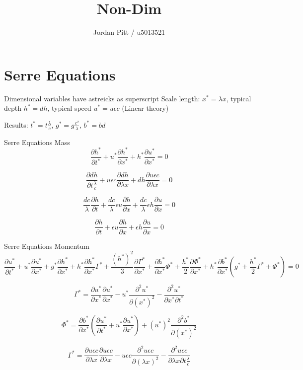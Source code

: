 \documentclass[12pt]{article}
\begin{document}
\title{Non-Dim}
\author{Jordan Pitt / u5013521}

\section{Serre Equations}
Dimensional variables have astreicks as superscript
Scale length: $x^* = \lambda x$, typical depth $h^* = dh$, typical speed $u^* = u\epsilon c$ (Linear theory)

Results: $t^* = t \frac{\lambda}{c}$, $g^* = g \frac{c^2}{\lambda}$, $b^* = bd$

Serre Equations Mass
\[\frac{\partial h^*}{\partial t^*} +u^*\frac{\partial h^*}{\partial x^*} + h^* \frac{\partial u^*}{\partial x^*}  = 0\]

\[\frac{\partial dh}{\partial t \frac{\lambda}{c}} +u\epsilon c\frac{\partial dh}{\partial \lambda x} + dh \frac{\partial u \epsilon c}{\partial \lambda x}  = 0\]

\[\frac{dc}{\lambda}\frac{\partial h}{\partial t} + \frac{dc}{\lambda} \epsilon u\frac{\partial h}{\partial x} + \frac{dc}{\lambda} \epsilon h \frac{\partial u}{\partial x}  = 0\]

\[\frac{\partial h}{\partial t} + \epsilon u\frac{\partial h}{\partial x} + \epsilon h \frac{\partial u}{\partial x}  = 0\]

Serre Equations Momentum
\[\frac{\partial u^*}{\partial t^*} + u^*\frac{\partial u^*}{\partial x^*} + g^*\frac{\partial h^*}{\partial x^*} + h^*\frac{\partial h^*}{\partial x^*}\Gamma^*+ \frac{\left(h^*\right)^2}{3}\frac{\partial \Gamma^*}{\partial x^*} + \frac{\partial h^*}{\partial x^*}\Phi^*+ \frac{h^*}{2}\frac{\partial \Phi^*}{\partial x^*} + h^* \frac{\partial b^*}{\partial x^*}\left(g^* + \frac{h^*}{2}\Gamma^* + \Phi^*\right) = 0   \]

\[\Gamma^* = \frac{\partial u^*}{\partial x^*}\frac{\partial u^*}{\partial x^*} - u^*\frac{\partial^2 u^*}{\partial (x^*)^2} - \frac{\partial^2 u^*}{\partial x^* \partial t^*}\]

\[\Phi^* = \frac{\partial b^*}{\partial x^*}\left( \frac{\partial u^*}{\partial t^*} + u^*\frac{\partial u^*}{\partial x^*}\right) + (u^*)^2\frac{\partial^2 b^*}{\partial (x^*)^2} \]

\[\Gamma^* = \frac{\partial u\epsilon c}{\partial \lambda x}\frac{\partial u\epsilon c}{\partial \lambda x} - u\epsilon c\frac{\partial^2 u \epsilon c}{\partial (\lambda x)^2} - \frac{\partial^2 u\epsilon c}{\partial \lambda x \partial t \frac{\lambda}{c}}\]
\end{document}
